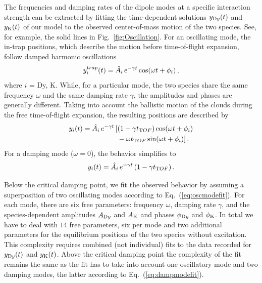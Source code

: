 The frequencies and damping rates of the dipole modes at a specific interaction strength can be extracted by fitting the time-dependent solutions $y_{\textrm Dy}(t)$ and $y_{\textrm K}(t)$ of our model %
to the observed center-of-mass motion of the two species. See, for example, the solid lines in Fig.~\ref{fig:Oscillation}. 
For an oscillating mode, the in-trap positions, which describe the motion before time-of-flight expansion, follow damped harmonic oscillations
\begin{equation}
{y}_i^{\textrm trap}(t) = \hat{A}_{i} \, e^{-\gamma t}\cos(\omega t + \phi_{i})  \, ,
\end{equation}
where $i$ = Dy, K. While, for a particular mode, the two species share the same frequency $\omega$ and the same damping rate $\gamma$, the amplitudes and phases are generally different.
Taking into account the ballistic motion of the clouds during the free time-of-flight expansion, the resulting positions are described by
\begin{equation}
\begin{aligned}
	{y}_i(t) = \hat{A}_{i} \, e^{-\gamma t} \,
	[&
	(1 - \gamma t_{\textrm TOF}) \cos(\omega t + \phi_{i})  
	\\& - \omega t_{\textrm TOF} \sin(\omega t + \phi_{i})
	] \, .
\end{aligned}
\label{eq:oscmodefit}
\end{equation}
For a damping mode ($\omega=0$), the behavior simplifies to
\begin{equation}
{y}_i(t) = \hat{A}_{i} \, e^{-\gamma t} \,
(1 - \gamma t_{\textrm TOF})
\, .
\label{eq:dampmodefit}
\end{equation}

Below the critical damping point, we fit the observed behavior by assuming a superposition of two oscillating modes according to Eq.~(\ref{eq:oscmodefit}). For each mode, there are six free parameters: frequency $\omega$, damping rate $\gamma$, and the species-dependent  amplitudes $A_{\textrm Dy}$ and $A_{\textrm K}$ and phases $\phi_{\textrm Dy}$ and $\phi_{\textrm K}$. In total we have to deal with $14$ free parameters, six per mode and two additional parameters for the equilibrium positions of the two species without excitation.
This complexity requires combined (not individual) fits to the data recorded for $y_{\textrm Dy}(t)$ and $y_{\textrm K}(t)$. Above the critical damping point the complexity of the fit remains the same as the fit has to take into account one oscillatory mode and two damping modes, the latter according to Eq.~(\ref{eq:dampmodefit}). 

